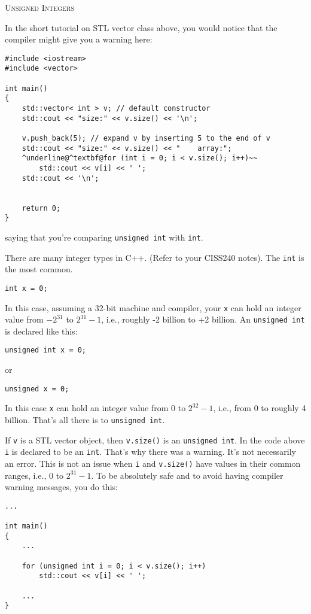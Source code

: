 \textsc{Unsigned Integers}

In the short tutorial on STL vector class above, you would notice 
that the compiler might give you a warning here:

\begin{Verbatim}[frame=single, commandchars=\^\@\~, fontsize=\footnotesize]
#include <iostream>
#include <vector>

int main()
{
    std::vector< int > v; // default constructor
    std::cout << "size:" << v.size() << '\n';
    
    v.push_back(5); // expand v by inserting 5 to the end of v
    std::cout << "size:" << v.size() << "    array:";
    ^underline@^textbf@for (int i = 0; i < v.size(); i++)~~
        std::cout << v[i] << ' ';
    std::cout << '\n';


    return 0;
}
\end{Verbatim}

saying that you're comparing \verb!unsigned int! with \verb!int!.

There are many integer types in C++. (Refer to your CISS240 notes). 
The \verb!int! is the most common. 
\begin{Verbatim}[frame=single,fontsize=\footnotesize]
int x = 0;
\end{Verbatim}
In this case, assuming a 32-bit machine and compiler, your \verb!x! 
can hold an integer value from $-2^{31}$ to $2^{31} - 1$, i.e., roughly 
-2 billion to +2 billion. An \verb!unsigned int! is declared like this:
\begin{Verbatim}[frame=single,fontsize=\footnotesize]
unsigned int x = 0;
\end{Verbatim}
or 
\begin{Verbatim}[frame=single,fontsize=\footnotesize]
unsigned x = 0;
\end{Verbatim}
In this case \verb!x! can hold an integer value from 0 to $2^{32} - 1$, 
i.e., from 0 to roughly 4 billion. That's all there is to 
\verb!unsigned int!.

If \verb!v! is a STL vector object, then \verb!v.size()! is an 
\verb!unsigned int!. In the code above \verb!i! is declared to 
be an \verb!int!. That's why there was a warning. It's not 
necessarily an error. This is not an issue when \verb!i! and 
\verb!v.size()! have values in their common ranges, i.e., 
0 to $2^{31} - 1$. To be absolutely safe and to avoid having compiler 
warning messages, you do this:
\begin{Verbatim}[frame=single,fontsize=\footnotesize]
...

int main()
{
    ...

    for (unsigned int i = 0; i < v.size(); i++)
        std::cout << v[i] << ' ';
    
    ...
}
\end{Verbatim}

